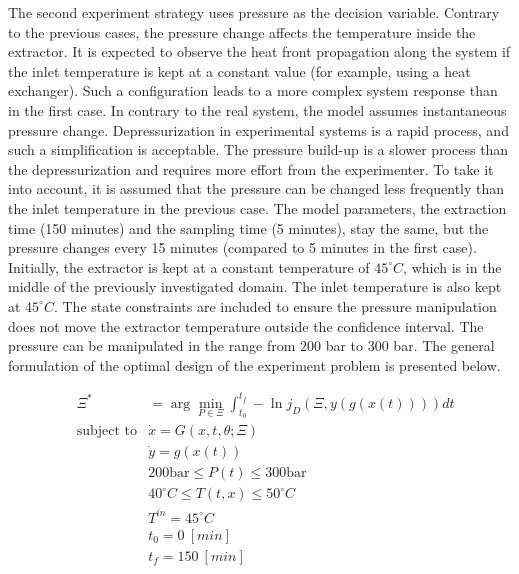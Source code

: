 \documentclass[../Article_Design_of_Experiment.tex]{subfiles}
\begin{document}
	The second experiment strategy uses pressure as the decision variable. Contrary to the previous cases, the pressure change affects the temperature inside the extractor. It is expected to observe the heat front propagation along the system if the inlet temperature is kept at a constant value (for example, using a heat exchanger). Such a configuration leads to a more complex system response than in the first case. In contrary to the real system, the model assumes instantaneous pressure change. Depressurization in experimental systems is a rapid process, and such a simplification is acceptable. The pressure build-up is a slower process than the depressurization and requires more effort from the experimenter. To take it into account, it is assumed that the pressure can be changed less frequently than the inlet temperature in the previous case. The model parameters, the extraction time (150 minutes) and the sampling time (5 minutes), stay the same, but the pressure changes every 15 minutes (compared to 5 minutes in the first case). Initially, the extractor is kept at a constant temperature of $45 ^\circ C$, which is in the middle of the previously investigated domain. The inlet temperature is also kept at $45^\circ C$. The state constraints are included to ensure the pressure manipulation does not move the extractor temperature outside the confidence interval. The pressure can be manipulated in the range from $200$ bar to $300$ bar. The general formulation of the optimal design of the experiment problem is presented below.
	
	{\footnotesize
		\begin{equation}
			\begin{aligned} 
				&\Xi^* &= \arg \min_{ P \in \Xi} \int_{t_0}^{t_f} - \ln j_D(\Xi,y(g(x(t)))) dt  \\
				&\text{subject to}
				& \dot{x} = G(x,t,\theta;\Xi) \\
				&& \dot{y} = g(x(t)) \\
				&& 200 \text{bar} \leq P(t) \leq 300 \text{bar} \\
				&& 40^\circ C \leq T(t,x) \leq 50^\circ C \\
				&& T^{in} = 45 ^\circ C \\
				&& t_0=0~[min] \\
				&& t_f=150~[min] \\
			\end{aligned}
	\end{equation} } 
		
\end{document}
